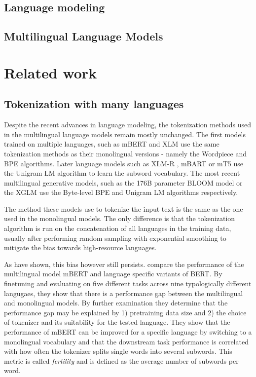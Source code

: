 \section{Language modeling}

\section{Multilingual Language Models}

\chapter{Related work}
\label{chap:related_work}

\section{Tokenization with many languages}

Despite the recent advances in language modeling, the tokenization methods used in the multilingual language models remain mostly unchanged. The first models trained on multiple languages, such as mBERT \cite{devlin_bert_2019} and XLM \cite{lample_cross-lingual_2019} use the same tokenization methods as their monolingual versions - namely the Wordpiece and BPE algorithms.
Later language models such as XLM-R \cite{conneau_unsupervised_2020}, mBART \cite{liu_multilingual_2020} or mT5 \cite{xue_mt5_2021} use the Unigram LM algorithm to learn the subword vocabulary. The most recent multilingual generative models, such as the 176B parameter BLOOM model \cite{scao_bloom_2022} or the XGLM \cite{lin_few-shot_2022} use the Byte-level BPE and Unigram LM algorithms respectively.

The method these models use to tokenize the input text is the same as the one used in the monolingual models. The only difference is that the tokenization algorithm is run on the concatenation of all languages in the training data, usually after performing random sampling with exponential smoothing to mitigate the bias towards high-resource languages.

As \citet{rust_how_2021} have shown, this bias however still persists. \citet{rust_how_2021} compare the performance of the multilingual model mBERT and language specific variants of BERT. By finetuning and evaluating on five different tasks across nine typologically different langugaes, they show that there is a performance gap between the multilingual and monolingual models. By further examination they determine that the performance gap may be explained by 1) pretraining data size and 2) the choice of tokenizer and its suitability for the tested language. They show that the performance of mBERT can be improved for a specific language by switching to a monolingual vocabulary and that the downstream task performance is correlated with how often the tokenizer splits single words into several subwords. This metric is called \textit{fertility} \cite{acs_exploring_2019} and is defined as the average number of subwords per word.

